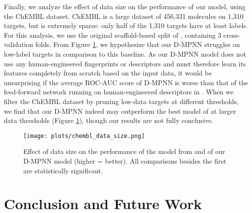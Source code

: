 \documentclass[journal=jcisd8,manuscript=article]{achemso}
\begin{document}
Finally, we analyze the effect of data size on the performance of our model, using the ChEMBL dataset. ChEMBL is a large dataset of 456,331 molecules on 1,310 targets, but is extremely sparse: only half of the 1,310 targets have at least  labels. For this analysis, we use the original scaffold-based split of \citeauthor{mayr2018chembl}\cite{mayr2018chembl}, containing 3 cross-validation folds. From Figure \ref{fig:dataset_size}, we hypothesize that our D-MPNN struggles on low-label targets in comparison to this baseline. As our D-MPNN model does not use any human-engineered fingerprints or descriptors and must therefore learn its features completely from scratch based on the input data, it would be unsurprising if the average ROC-AUC score of D-MPNN is worse than that of the feed-forward network running on human-engineered descriptors in \citeauthor{mayr2018chembl}\cite{mayr2018chembl}. When we filter the ChEMBL dataset by pruning low-data targets at different thresholds, we find that our D-MPNN indeed may outperform the best model of \citeauthor{mayr2018chembl}\cite{mayr2018chembl} at larger data thresholds (Figure \ref{fig:dataset_size}), though our results are not fully conclusive.

\FloatBarrier

\begin{figure}
    \centering
    \texttt{[image: plots/chembl\_data\_size.png]}
    \caption{Effect of data size on the performance of the model from \citeauthor{mayr2018chembl}\cite{mayr2018chembl} and of our D-MPNN model (higher = better). All comparisons besides the first are statistically significant.}
    \label{fig:dataset_size}
\end{figure}

\section{Conclusion and Future Work}

\begin{table}[]
    \caption{Number of public datasets where D-MPNN is statistically significantly better than, equivalent to, or worse than each baseline model.}
    \label{tab:significant_improvements}
\end{table}
\end{document}

